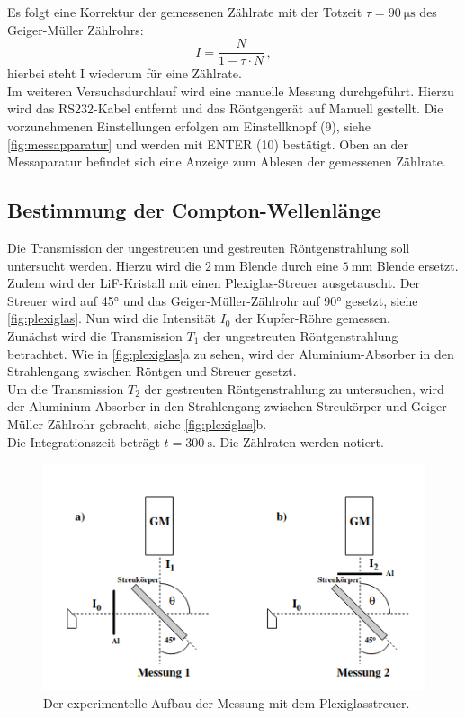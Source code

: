 Es folgt eine Korrektur der gemessenen Zählrate mit der Totzeit $\tau = \SI{90}{\micro\second}$ des Geiger-Müller Zählrohrs:
\begin{equation}\label{eqn:korrektur}
    I = \frac{N}{1 - \tau \cdot N} \, ,
\end{equation}
hierbei steht I wiederum für eine Zählrate.\\

\noindent
Im weiteren Versuchsdurchlauf wird eine manuelle Messung durchgeführt.
Hierzu wird das RS232-Kabel entfernt und das Röntgengerät auf Manuell gestellt.
Die vorzunehmenen Einstellungen erfolgen am Einstellknopf (9), siehe \autoref{fig:messapparatur} und werden mit ENTER (10) bestätigt.
Oben an der Messaparatur befindet sich eine Anzeige zum Ablesen der gemessenen Zählrate.

\subsection{Bestimmung der Compton-Wellenlänge}
Die Transmission der ungestreuten und gestreuten Röntgenstrahlung soll untersucht werden.
Hierzu wird die $\SI{2}{\milli\metre}$ Blende durch eine $\SI{5}{\milli\metre}$ Blende ersetzt.
Zudem wird der LiF-Kristall mit einen Plexiglas-Streuer ausgetauscht.
Der Streuer wird auf 45° und das Geiger-Müller-Zählrohr auf 90° gesetzt, siehe \autoref{fig:plexiglas}.
Nun wird die Intensität $I_0$ der Kupfer-Röhre gemessen. \\
\noindent
Zunächst wird die Transmission $T_1$ der ungestreuten Röntgenstrahlung betrachtet.
Wie in \autoref{fig:plexiglas}a zu sehen, wird der Aluminium-Absorber in den Strahlengang zwischen Röntgen und Streuer gesetzt. \\
\noindent
Um die Transmission $T_2$ der gestreuten Röntgenstrahlung zu untersuchen, wird der Aluminium-Absorber in den Strahlengang zwischen Streukörper und Geiger-Müller-Zählrohr gebracht,
siehe \autoref{fig:plexiglas}b. \\
Die Integrationszeit beträgt $t = \SI{300}{\second}$.
Die Zählraten werden notiert.

\begin{figure}
    \centering
    \includegraphics[width=\textwidth]{bilder/plexiglas_aufbau.png}
    \caption{Der experimentelle Aufbau der Messung mit dem Plexiglasstreuer. \cite{anleitung} }
    \label{fig:plexiglas}
\end{figure}